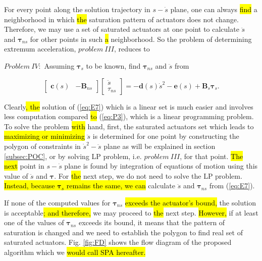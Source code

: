 \documentclass{rob}%
\begin{document}
For every point along the solution trajectory in $ s-\dot s $ plane, one can always \hl{find} a neighborhood in which \hl{the} saturation pattern of actuators does not change. Therefore, we may use a set of saturated actuators at one point to calculate $ \ddot s $ and $ \boldsymbol \tau_{ns} $ for other points in such \hl{a} neighborhood.
So the problem of determining extremum acceleration, $ problem \ III $, reduces to\medskip 

$ Problem \ IV: $ Assuming $ \boldsymbol {\tau}_s $ to be known, find $ \boldsymbol \tau_{ns} $ and $ \ddot s $ from

\begin{equation}
\label{eq:E7}
\begin{bmatrix} {\boldsymbol c}(s) & -{\mathbf B}_{ns} \end{bmatrix}
\begin{bmatrix} \ddot s \\ {\tau}_{ns} \end{bmatrix}  
=-{\boldsymbol d}(s)\dot s^2-{\boldsymbol e}(s)+{\mathbf B}_{s} \boldsymbol{\tau}_{s}.
\end{equation} 

Clearly\hl{, the} solution of (\ref{eq:E7}) which is a linear set is much easier and involves less computation compared \hl{to} (\ref{eq:P3}), which is a linear programming problem.
To solve the problem \hl{with} hand, first, the saturated actuators set which leads to \hl{maximizing or minimizing} $ \ddot s $ is determined for one point by constructing the polygon of constraints in $ {\dot s}^2-\ddot s $ plane as will be explained in section \ref{subsec:POC}, or by solving LP problem, i.e. $ problem \ III $, for that point. \hl{The next} point in $ s-\dot s $ plane is found by integration of equations of motion using this value of $ \ddot s $ and $ \boldsymbol{\tau} $. For \hl{the} next step, we do not need to solve the LP problem. \hl{Instead, because $ \boldsymbol{\tau}_{s} $ remains the same, we can} calculate $ \ddot s $ and $ \boldsymbol{\tau}_{ns} $ from (\ref{eq:E7}).


If none of the computed values for $ \boldsymbol{\tau}_{ns} $ \hl{exceeds the actuator's bound,} the solution is acceptable\hl{; and therefore,} we may proceed to \hl{the} next step. \hl{However,} if at least one of the values of $ \boldsymbol{\tau}_{ns} $ exceeds its bound, it means that the pattern of saturation is changed and we need to establish the polygon to find real set of saturated actuators.
Fig. \ref{fig:FD} shows the flow diagram of the proposed algorithm which we \hl{would call SPA hereafter.}
\end{document}

